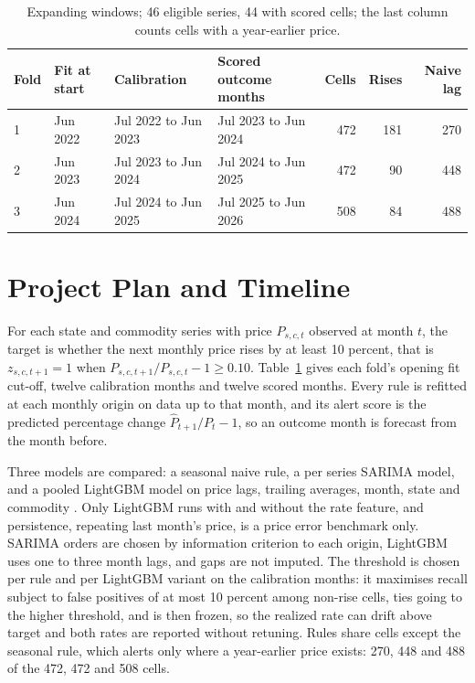 \documentclass[11pt,a4paper]{article}
\begin{document}
\begin{table}[h!]
  \centering
  \footnotesize
  \renewcommand{\arraystretch}{0.95}
  \caption{Expanding windows; 46 eligible series, 44 with scored cells; the last column counts cells with a year-earlier price.}
  \label{tab:folds}
  \begin{tabularx}{\linewidth}{@{}l l X X r r r@{}}
    \toprule
    \textbf{Fold} & \textbf{Fit at start} & \textbf{Calibration} & \textbf{Scored outcome months} & \textbf{Cells} & \textbf{Rises} & \textbf{Naive lag} \\
    \midrule
    1 & Jun 2022 & Jul 2022 to Jun 2023 & Jul 2023 to Jun 2024 & 472 & 181 & 270 \\
    2 & Jun 2023 & Jul 2023 to Jun 2024 & Jul 2024 to Jun 2025 & 472 & 90 & 448 \\
    3 & Jun 2024 & Jul 2024 to Jun 2025 & Jul 2025 to Jun 2026 & 508 & 84 & 488 \\
    \bottomrule
  \end{tabularx}
\end{table}

\section{Project Plan and Timeline}\label{sec:plan}

For each state and commodity series with price $P_{s,c,t}$ observed at month $t$, the target is whether the next monthly price rises by at least 10 percent, that is $z_{s,c,t+1} = 1$ when $P_{s,c,t+1}/P_{s,c,t} - 1 \ge 0.10$. Table~\ref{tab:folds} gives each fold's opening fit cut-off, twelve calibration months and twelve scored months. Every rule is refitted at each monthly origin on data up to that month, and its alert score is the predicted percentage change $\hat{P}_{t+1}/P_t - 1$, so an outcome month is forecast from the month before.

Three models are compared: a seasonal naive rule, a per series SARIMA model, and a pooled LightGBM model on price lags, trailing averages, month, state and commodity \cite{ke2017lightgbm}. Only LightGBM runs with and without the rate feature, and persistence, repeating last month's price, is a price error benchmark only. SARIMA orders are chosen by information criterion to each origin, LightGBM uses one to three month lags, and gaps are not imputed. The threshold is chosen per rule and per LightGBM variant on the calibration months: it maximises recall subject to false positives of at most 10 percent among non-rise cells, ties going to the higher threshold, and is then frozen, so the realized rate can drift above target and both rates are reported without retuning. Rules share cells except the seasonal rule, which alerts only where a year-earlier price exists: 270, 448 and 488 of the 472, 472 and 508 cells.
\end{document}
